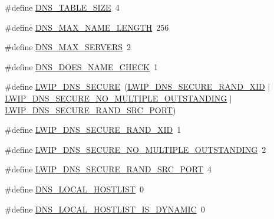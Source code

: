 \begin{DoxyCompactItemize}
\item 
\#define \hyperlink{group__lwip__opts__dns_ga2384e76c1acdf969d883f3de08d340f7}{D\+N\+S\+\_\+\+T\+A\+B\+L\+E\+\_\+\+S\+I\+ZE}~4
\item 
\#define \hyperlink{group__lwip__opts__dns_ga3b01c79902063c170ef57deb72f56124}{D\+N\+S\+\_\+\+M\+A\+X\+\_\+\+N\+A\+M\+E\+\_\+\+L\+E\+N\+G\+TH}~256
\item 
\#define \hyperlink{group__lwip__opts__dns_ga9f9881c887a8aceb9765820c2dbdf292}{D\+N\+S\+\_\+\+M\+A\+X\+\_\+\+S\+E\+R\+V\+E\+RS}~2
\item 
\#define \hyperlink{group__lwip__opts__dns_ga07ffd8e9106dae3b65347bd03811a4b6}{D\+N\+S\+\_\+\+D\+O\+E\+S\+\_\+\+N\+A\+M\+E\+\_\+\+C\+H\+E\+CK}~1
\item 
\#define \hyperlink{group__lwip__opts__dns_ga8979c30dfbfde609d5139f80aabdfcc5}{L\+W\+I\+P\+\_\+\+D\+N\+S\+\_\+\+S\+E\+C\+U\+RE}~(\hyperlink{group__lwip__opts__dns_ga247795be83258f9afd0e3649a20fe30d}{L\+W\+I\+P\+\_\+\+D\+N\+S\+\_\+\+S\+E\+C\+U\+R\+E\+\_\+\+R\+A\+N\+D\+\_\+\+X\+ID} $\vert$ \hyperlink{group__lwip__opts__dns_ga5cabf5668bb2532408d9dcb8caf56092}{L\+W\+I\+P\+\_\+\+D\+N\+S\+\_\+\+S\+E\+C\+U\+R\+E\+\_\+\+N\+O\+\_\+\+M\+U\+L\+T\+I\+P\+L\+E\+\_\+\+O\+U\+T\+S\+T\+A\+N\+D\+I\+NG} $\vert$ \hyperlink{group__lwip__opts__dns_ga3aa0b17e6093d9e109790b28d6adfa65}{L\+W\+I\+P\+\_\+\+D\+N\+S\+\_\+\+S\+E\+C\+U\+R\+E\+\_\+\+R\+A\+N\+D\+\_\+\+S\+R\+C\+\_\+\+P\+O\+RT})
\item 
\#define \hyperlink{group__lwip__opts__dns_ga247795be83258f9afd0e3649a20fe30d}{L\+W\+I\+P\+\_\+\+D\+N\+S\+\_\+\+S\+E\+C\+U\+R\+E\+\_\+\+R\+A\+N\+D\+\_\+\+X\+ID}~1
\item 
\#define \hyperlink{group__lwip__opts__dns_ga5cabf5668bb2532408d9dcb8caf56092}{L\+W\+I\+P\+\_\+\+D\+N\+S\+\_\+\+S\+E\+C\+U\+R\+E\+\_\+\+N\+O\+\_\+\+M\+U\+L\+T\+I\+P\+L\+E\+\_\+\+O\+U\+T\+S\+T\+A\+N\+D\+I\+NG}~2
\item 
\#define \hyperlink{group__lwip__opts__dns_ga3aa0b17e6093d9e109790b28d6adfa65}{L\+W\+I\+P\+\_\+\+D\+N\+S\+\_\+\+S\+E\+C\+U\+R\+E\+\_\+\+R\+A\+N\+D\+\_\+\+S\+R\+C\+\_\+\+P\+O\+RT}~4
\item 
\#define \hyperlink{group__lwip__opts__dns_gacba1ac491c1b47b98dfbd0d5c1662659}{D\+N\+S\+\_\+\+L\+O\+C\+A\+L\+\_\+\+H\+O\+S\+T\+L\+I\+ST}~0
\item 
\#define \hyperlink{group__lwip__opts__dns_ga8235a5fb0a1c1cceeee670cf95612ba8}{D\+N\+S\+\_\+\+L\+O\+C\+A\+L\+\_\+\+H\+O\+S\+T\+L\+I\+S\+T\+\_\+\+I\+S\+\_\+\+D\+Y\+N\+A\+M\+IC}~0
\item 

\end{DoxyCompactItemize}
